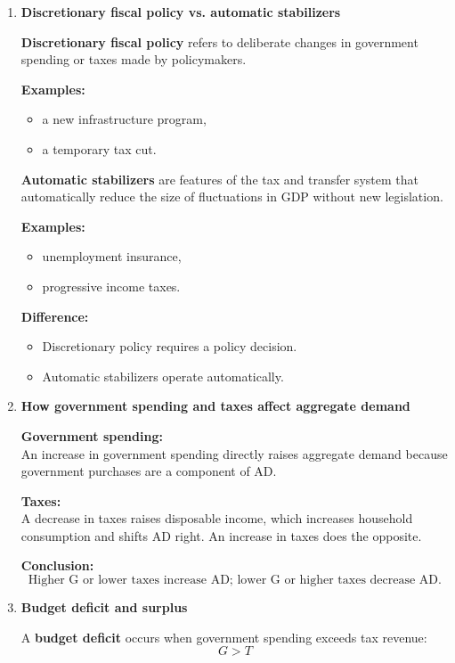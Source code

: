 \documentclass[12pt]{article}
\begin{document}
\begin{enumerate}[label=\textbf{\arabic*.}, start=13]

\item \textbf{Discretionary fiscal policy vs. automatic stabilizers}

\textbf{Discretionary fiscal policy} refers to deliberate changes in government spending or taxes made by policymakers.

\textbf{Examples:}
\begin{itemize}
    \item a new infrastructure program,
    \item a temporary tax cut.
\end{itemize}

\textbf{Automatic stabilizers} are features of the tax and transfer system that automatically reduce the size of fluctuations in GDP without new legislation.

\textbf{Examples:}
\begin{itemize}
    \item unemployment insurance,
    \item progressive income taxes.
\end{itemize}

\textbf{Difference:}
\begin{itemize}
    \item Discretionary policy requires a policy decision.
    \item Automatic stabilizers operate automatically.
\end{itemize}

\item \textbf{How government spending and taxes affect aggregate demand}

\textbf{Government spending:}\\
An increase in government spending directly raises aggregate demand because government purchases are a component of AD.

\textbf{Taxes:}\\
A decrease in taxes raises disposable income, which increases household consumption and shifts AD right. An increase in taxes does the opposite.

\textbf{Conclusion:}
\[
\boxed{\text{Higher G or lower taxes increase AD; lower G or higher taxes decrease AD.}}
\]

\item \textbf{Budget deficit and surplus}

A \textbf{budget deficit} occurs when government spending exceeds tax revenue:
\[
G > T
\]


\end{enumerate}
\end{document}
